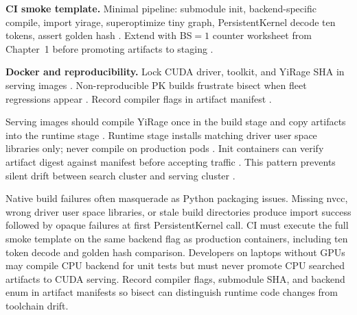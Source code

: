 \textbf{CI smoke template.} Minimal pipeline: submodule init, backend-specific compile, import yirage, superoptimize tiny graph, PersistentKernel decode ten tokens, assert golden hash \citep{yirage2026,chen2020compilerbasedhardw,patel2025llminference,kwon2023vllm,taxbreak2026,memoryfloor2026,nvidia2024cudagraphs,dao2022flashattention,liu2024deepseekv3,semianalysis2024tma,amd2024xdna,amd2024aie,dao2023flashdecoding,nvidia2022hopper,dlbook}. Extend with BS${=}1$ counter worksheet from Chapter~1 before promoting artifacts to staging \citep{taxbreak2026,memoryfloor2026,patel2025llminference,yirage2026,chen2020compilerbasedhardw,kwon2023vllm,dlbook}.

\textbf{Docker and reproducibility.} Lock CUDA driver, toolkit, and YiRage SHA in serving images \citep{yirage2026,chen2020compilerbasedhardw,patel2025llminference,kwon2023vllm,taxbreak2026,memoryfloor2026,nvidia2024cudagraphs,dao2022flashattention,liu2024deepseekv3,semianalysis2024tma,amd2024xdna,amd2024aie,dao2023flashdecoding,nvidia2022hopper,dlbook}. Non-reproducible PK builds frustrate bisect when fleet regressions appear \citep{patel2025llminference,yirage2026,chen2020compilerbasedhardw,memoryfloor2026,taxbreak2026,dlbook}. Record compiler flags in artifact manifest \citep{yirage2026,chen2020compilerbasedhardw,patel2025llminference,dlbook,kwon2023vllm,taxbreak2026,memoryfloor2026,nvidia2024cudagraphs,dao2022flashattention,liu2024deepseekv3,semianalysis2024tma,amd2024aie,amd2024xdna,dao2023flashdecoding,nvidia2022hopper,dlbook}.

Serving images should compile YiRage once in the build stage and copy artifacts into the runtime stage \citep{yirage2026,chen2020compilerbasedhardw,patel2025llminference,dlbook}. Runtime stage installs matching driver user space libraries only; never compile on production pods \citep{patel2025llminference,yirage2026,chen2020compilerbasedhardw,dlbook}. Init containers can verify artifact digest against manifest before accepting traffic \citep{yirage2026,chen2020compilerbasedhardw,patel2025llminference,kwon2023vllm,dlbook}. This pattern prevents silent drift between search cluster and serving cluster \citep{yirage2026,chen2020compilerbasedhardw,patel2025llminference,taxbreak2026,memoryfloor2026,dlbook}.

Native build failures often masquerade as Python packaging issues. Missing nvcc, wrong driver user space libraries, or stale build directories produce import success followed by opaque failures at first PersistentKernel call. CI must execute the full smoke template on the same backend flag as production containers, including ten token decode and golden hash comparison. Developers on laptops without GPUs may compile CPU backend for unit tests but must never promote CPU searched artifacts to CUDA serving. Record compiler flags, submodule SHA, and backend enum in artifact manifests so bisect can distinguish runtime code changes from toolchain drift.

